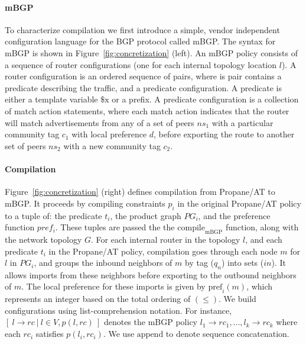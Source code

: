 \documentclass[numbers, 10pt, preprint]{sigplanconf}
\newcommand{\sysname}{{\text{}\small \sf Propane/AT}\xspace}
\newcommand{\mbgp}{{\small \sf mBGP}\xspace}
\newcommand{\para}[1]{\paragraph*{\textbf{#1}}}
\begin{document}
\para{mBGP}
To characterize compilation we first introduce a simple, vendor independent configuration language for the BGP protocol called \mbgp. The syntax for \mbgp is shown in Figure~\ref{fig:concretization} (left). An \mbgp policy consists of a sequence of router configurations (one for each internal topology location $l$). A router configuration is an ordered sequence of pairs, where is pair contains
a predicate describing the traffic, and a predicate configuration. A predicate is either a template variable $\$\mathrm{x}$ or a prefix. A predicate configuration is a collection of match action statements, where each match action indicates that the router will match advertisements from any of a set of peers $ns_1$ with a particular community tag $c_1$ with local preference $d$, before exporting the route to another set of peers $ns_2$ with a new community tag $c_2$.


\para{Compilation}

Figure~\ref{fig:concretization} (right) defines compilation from \sysname to \mbgp. It proceeds by compiling constraints $p_i$ in the original \sysname policy to a tuple of: the predicate $t_i$, the product graph $PG_i$, and the preference function $pref_i$. These tuples are passed the the $\mathrm{compile}_\mathrm{mBGP}$ function, along with the network topology $G$. For each internal router in the topology $l$, and each predicate $t_i$ in the \sysname policy, compilation goes through each node $m$ for $l$ in $PG_i$, and groups the inbound neighbors of $m$ by tag ($q_n$) into sets ($in$). It allows imports from these neighbors before exporting to the outbound neighbors of $m$. The local preference for these imports is given by $\mathrm{pref}_i(m)$, which represents an integer based on the total ordering of $(\leq)$. We build configurations using list-comprehension notation. For instance, $[~ l \rightarrow rc ~\vert~ l \in V, p(l,rc) ~]$ denotes the \mbgp policy $l_1 \rightarrow rc_{1},...,l_k \rightarrow rc_{k}$ where each $rc_{i}$ satisfies $p(l_i,rc_{i})$. We use $\mathrm{append}$ to denote sequence concatenation.%
\end{document}
